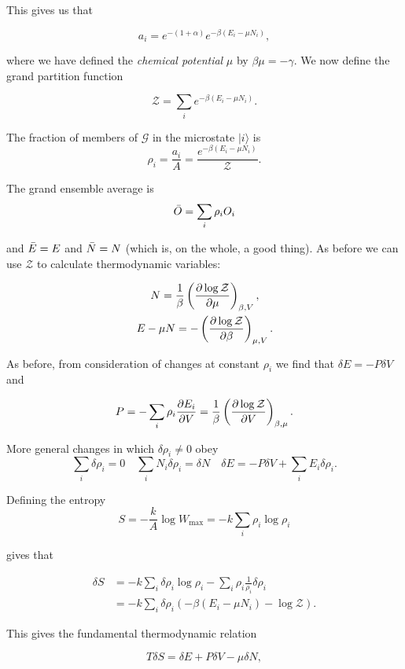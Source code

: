 \documentclass{notes}
\newcommand{\cZ}{\mathcal{Z}}
\newcommand{\cG}{\mathcal{G}}
\newcommand{\ket}[1]{|#1\rangle}
\newcommand{\pdf}[3]{\left(\pd{#1}{#2}\right)_{#3}}
\begin{document}
This gives us that

\[
a_i = e^{-(1+\alpha)} e^{- \beta (E_i - \mu N_i)},
\]

where we have defined the \emph{chemical potential} $\mu$ by
$\beta \mu = - \gamma$.  We now define the grand partition function

\begin{equation}\label{eq:gpf}
\cZ = \sum_i e^{- \beta ( E_i - \mu N_i  )}.
\end{equation}

The fraction of members of $\cG$ in the microstate $\ket{i}$ is
\[
\rho_i = \frac{a_i}{A} = \frac{e^{-\beta (E_i - \mu N_i)}}{\cZ}.
\]

The grand ensemble average is
\[
\Bar{O} = \sum_i \rho_i O_i
\]

and $\Bar{E} = E$ and $\Bar{N} = N$ (which is, on the whole, a good thing).
As before we can use $\cZ$ to calculate thermodynamic variables:

\begin{gather}
N = \frac{1}{\beta} \pdf{\log \cZ}{\mu}{\beta,V},\label{eq:gpfN}\\
E - \mu N = - \pdf{\log \cZ}{\beta}{\mu,V}. \label{eq:gpfE}
\end{gather}

As before, from consideration of changes at constant $\rho_i$ we find that
$\delta E = -P \delta V$ and

\begin{equation}\label{eq:gpfP}
P = - \sum_i \rho_i \pd{E_i}{V} = \frac{1}{\beta} \pdf{\log \cZ}{V}{\beta,\mu}.
\end{equation}

More general changes in which $\delta \rho_i \neq 0$ obey
\[
\sum_i \delta \rho_i = 0 \quad \sum_i N_i \delta \rho_i = \delta N
\quad \delta E = - P \delta V + \sum_i E_i \delta \rho_i.
\]

Defining the entropy
\[
S = - \frac{k}{A} \log W_{\text{max}} = - k \sum_i \rho_i \log \rho_i
\]

gives that

\begin{align*}
\delta S &= - k \sum_i \delta \rho_i \log \rho_i - \sum_i \rho_i
\frac{1}{\rho_i} \delta \rho_i \\
&= - k \sum_i \delta \rho_i \left(- \beta (E_i - \mu N_i) - \log \cZ \right).
\end{align*}

This gives the fundamental thermodynamic relation

\begin{equation}
T \delta S = \delta E + P \delta V - \mu \delta N,
\end{equation}
\end{document}
